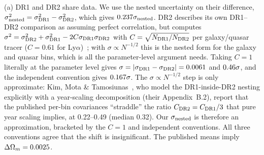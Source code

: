 \documentclass[11pt]{article}
\begin{document}
(a) DR1 and DR2 share data. We use the nested uncertainty on their difference,
$\sigma_{\rm nested}^2=\sigma_{\rm DR1}^2-\sigma_{\rm DR2}^2$, which gives $0.237\sigma_{\rm nested}$. DR2 describes its own DR1--DR2 comparison as
assuming perfect correlation, but computes $\sigma^2=\sigma_{\rm DR2}^2+\sigma_{\rm DR1}^2-2C\sigma_{\rm DR1}\sigma_{\rm DR2}$ with $C=\sqrt{N_{\rm DR1}/N_{\rm DR2}}$
per galaxy/quasar tracer ($C=0.61$ for Ly$\alpha$)~\cite[Sec.~III.C.1 and footnote~12]{desi2025dr2}; with $\sigma\propto N^{-1/2}$ this is the nested form for the galaxy and quasar bins, which is all the parameter-level argument needs. Taking $C=1$ literally at the
parameter level gives $\sigma=|\sigma_{\rm DR1}-\sigma_{\rm DR2}|=0.0061$ and $0.46\sigma$, and the independent convention gives $0.167\sigma$.
The $\sigma\propto N^{-1/2}$ step is only approximate: Kim, Mota \& Tamosiunas~\cite{kim2026}, who model the DR1-inside-DR2 nesting explicitly with a
year-scaling decomposition (their Appendix~B.2), report that the published per-bin covariances ``straddle'' the ratio $C_{\rm DR2}=C_{\rm DR1}/3$ that pure year scaling
implies, at 0.22--0.49 (median 0.32). Our $\sigma_{\rm nested}$ is therefore an approximation, bracketed by the $C=1$ and independent conventions.
All three conventions agree that the shift is insignificant. The published means imply $\Delta\Omega_m=0.0025$.
\end{document}
